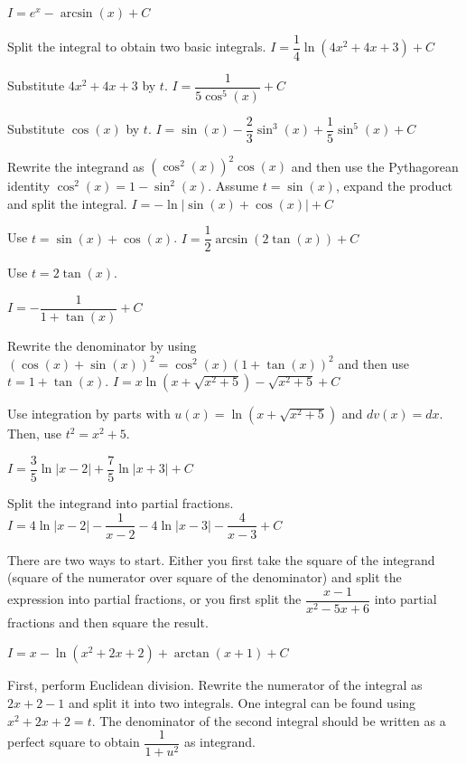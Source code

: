 \begin{Answer}

    	\Question $I=e^x-\arcsin (x) + C$
    	
    	 Split the integral to obtain two basic integrals.
    	\Question $I=\dfrac{1}{4} \ln \left(4x^2+4x+3\right) + C$
    	
    	 Substitute $4x^2+4x+3$ by $t$.
    	\Question $I=\dfrac{1}{5\cos^5 (x)} + C$
    	
    	 Substitute $\cos(x)$ by $t$.
    	\Question $ I = \sin (x)- \dfrac{2}{3}\sin^3 (x) + \dfrac{1}{5}\sin^5 (x) + C$
    	
    	 Rewrite the integrand as $\left(\cos^2 (x)\right)^2\cos (x)$ and then use the Pythagorean identity $\cos^2 (x) = 1 - \sin^2 (x)$. Assume $t=\sin (x)$, expand the product and split the integral.
    	\Question $I = -\ln |\sin (x) + \cos (x)| + C $
    	
    	 Use $t=\sin (x)+\cos (x)$.
    		\Question $I = \dfrac{1}{2}\arcsin\left(2\tan (x) \right) + C$
    	
    	 Use $t=2\tan (x)$.
    		
    	\Question $ I = -\dfrac{1}{1+\tan (x)} + C$
    	
    	 Rewrite the denominator by using $(\cos (x) + \sin (x))^2  = \cos^2 (x) \left(1+\tan (x)\right)^2$ and then use $t=1+\tan (x)$.
    	\Question $I = x\ln \left(x+\sqrt{x^2+5}\right) - \sqrt{x^2+5} + C$
    	
    	 Use integration by parts with $u(x) = \ln\left(x+\sqrt{x^2+5}\right)$ and $dv(x)=dx$. Then, use $t^2=x^2+5$.
        
    	\Question $I = \dfrac{3}{5} \ln |x-2| + \dfrac{7}{5} \ln |x+3| + C$ 
    	
    	 Split the integrand into partial fractions.
    	\Question $I = 4\ln |x-2| - \dfrac{1}{x-2} - 4\ln |x-3| - \dfrac{4}{x-3} + C$ 
    	
    	 There are two ways to start. Either you first take the square of the integrand (square of the numerator over square of the denominator) and split the expression into partial fractions, or you first split the  $\dfrac{x-1}{x^2 -5x +6} $ into partial fractions and then square the result. 
    	
    	\Question $I = x - \ln (x^2+2x+2) + \arctan (x+1) + C$
    	
    	 First, perform Euclidean division. Rewrite the numerator of the integral as $2x + 2 - 1$ and split it into two integrals. One integral can be found using $x^2 + 2x + 2=t$. The denominator of the second integral should be written as a perfect square to obtain $\dfrac{1}{1+u^2}$ as integrand. 
    

\end{Answer}
